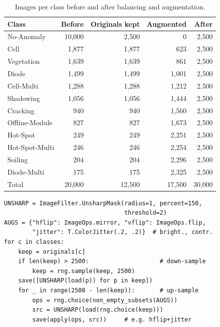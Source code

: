 \documentclass[10pt,twocolumn,letterpaper]{article}
\begin{document}
\begin{table}[t]
\centering\footnotesize\setlength{\tabcolsep}{4pt}
\begin{tabular}{@{}lrrrr@{}}
\toprule
Class & Before & Originals kept & Augmented & After \\
\midrule
No-Anomaly & 10{,}000 & 2{,}500 & 0 & 2{,}500 \\
Cell & 1{,}877 & 1{,}877 & 623 & 2{,}500 \\
Vegetation & 1{,}639 & 1{,}639 & 861 & 2{,}500 \\
Diode & 1{,}499 & 1{,}499 & 1{,}001 & 2{,}500 \\
Cell-Multi & 1{,}288 & 1{,}288 & 1{,}212 & 2{,}500 \\
Shadowing & 1{,}056 & 1{,}056 & 1{,}444 & 2{,}500 \\
Cracking & 940 & 940 & 1{,}560 & 2{,}500 \\
Offline-Module & 827 & 827 & 1{,}673 & 2{,}500 \\
Hot-Spot & 249 & 249 & 2{,}251 & 2{,}500 \\
Hot-Spot-Multi & 246 & 246 & 2{,}254 & 2{,}500 \\
Soiling & 204 & 204 & 2{,}296 & 2{,}500 \\
Diode-Multi & 175 & 175 & 2{,}325 & 2{,}500 \\
\midrule
Total & 20{,}000 & 12{,}500 & 17{,}500 & 30{,}000 \\
\bottomrule
\end{tabular}
\caption{Images per class before and after balancing and augmentation.}
\label{tab:pv}
\end{table}

\begin{lstlisting}[float=tbp,caption={Unsharp masking and augmentation (excerpt).},label={lst:aug}]
UNSHARP = ImageFilter.UnsharpMask(radius=1, percent=150,
                                  threshold=2)
AUGS = {"hflip": ImageOps.mirror, "vflip": ImageOps.flip,
        "jitter": T.ColorJitter(.2, .2)}  # bright., contr.
for c in classes:
    keep = originals[c]
    if len(keep) > 2500:                    # down-sample
        keep = rng.sample(keep, 2500)
    save([UNSHARP(load(p)) for p in keep])
    for _ in range(2500 - len(keep)):       # up-sample
        ops = rng.choice(non_empty_subsets(AUGS))
        src = UNSHARP(load(rng.choice(keep)))
        save(apply(ops, src))     # e.g. hflip+jitter
\end{lstlisting}
\end{document}
